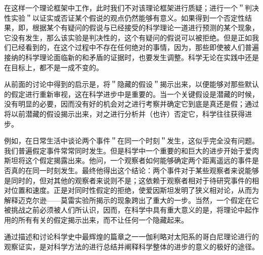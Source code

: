 在这样一个理论框架中工作，此时我们不对该理论框架进行质疑；进行一个＂判决性实验＂以证实或否证某个假说的观点仍然能够有意义。如果得到一个否定性结果，即，根据某个有疑问的假说与已经接受的科学理论一道进行预测的某个现象，它没有发生，那么该实验是判决性的，这个有疑问的假说可以被拒绝。但是正如我们已经看到的，在这个过程中不存在任何绝对的事情，因为，那些即使被人们普遍接纳的科学理论面临新的和矛盾的证据时，也要发生调整。科学无论在实践中还是在目标上，都不是一成不变的。

从前面的讨论中得到的启示是，将＂隐藏的假设＂揭示出来，以便能够对那些默认的假定进行重新审视，这在科学进步中是重要的。当一个关键假设是潜藏的时候，没有明显的必要，因而没有好的机会对之进行考察并确定它到底是真还是假；通过将以前潜藏的假设揭示出来，对之进行分析并（也许）否定它，科学往往获得进步。

例如，在日常生活中谈论两个事件＂在同一个时刻＂发生，这似乎完全没有问题。我们普遍假定事件常常同时发生。但是科学中一个重要的和巨大的进步开始于爱肉斯坦将这个假定揭露出来。他问，一个观察者如何能够确定两个距离遥远的事件是否真的在同一时刻发生。最终他得出这个结论：两个事件对于某些观察者来说能够是同时的，但对其他的观察者来说则不是；这依赖于观察者相对于待研究事件的相对位置和速度。正是对同时性假定的拒绝，使爱因斯坦发明了狭义相对论，从而为解释迈克尔逊——莫雷实验所揭示的现象跨出了重大的一步。当然，一个假定在它被挑战之前必须被人们所认识，因而，在科学中具有重大意义的是，将理论中起作用的所有有关的假定揭示出来，而不让任何一个隐藏起来。

通过描述和讨论科学史中最辉煌的篇章之一一伽利略对太阳系的哥白尼理论进行的观察证实，是对科学方法的进行总结并阐释科学整体的进步的意义的极好的途径。 